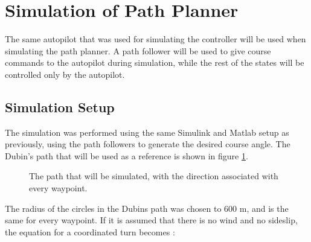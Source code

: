 \section{Simulation of Path Planner}

The same autopilot that was used for simulating the controller will be used when simulating the path planner. A path follower will be used to give course commands to the autopilot during simulation, while the rest of the states will be controlled only by the autopilot.


\subsection{Simulation Setup}

The simulation was performed using the same Simulink and Matlab setup as previously, using the path followers to generate the desired course angle. The Dubin's path that will be used as a reference is shown in figure \ref{fig:dubins_reference}.

\begin{figure}[!ht]
    \centering
    \caption{The path that will be simulated, with the direction associated with every waypoint.}
	\label{fig:dubins_reference}
\end{figure}

The radius of the circles in the Dubins path was chosen to $600$ m, and is the same for every waypoint. If it is assumed that there is no wind and no sideslip, the equation for a coordinated turn becomes \cite{suaBEARD}:

